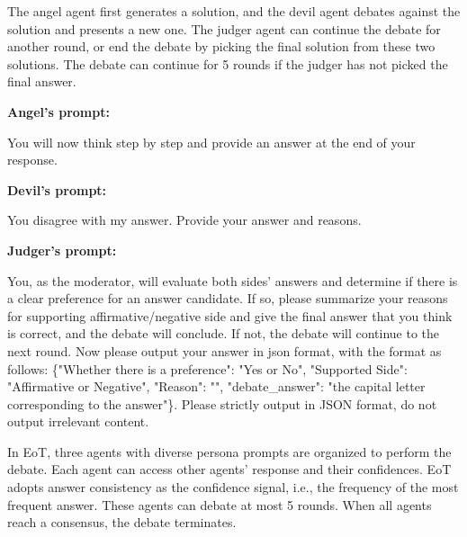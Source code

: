  The angel agent first generates a solution, and the devil agent debates against the solution and presents a new one. The judger agent can continue the debate for another round, or end the debate by picking the final solution from these two solutions. The debate can continue for 5 rounds if the judger has not picked the final answer.

\begin{tcolorbox}[colback=gray!10!white, colframe=black!70!white, breakable]
\textbf{Angel's prompt:}

You will now think step by step and provide an answer at the end of your response.

\textbf{Devil's prompt:}

You disagree with my answer. Provide your answer and reasons.

\textbf{Judger's prompt:}

You, as the moderator, will evaluate both sides' answers and determine if there is a clear preference for an answer candidate. If so, please summarize your reasons for supporting affirmative/negative side and give the final answer that you think is correct, and the debate will conclude. If not, the debate will continue to the next round. Now please output your answer in json format, with the format as follows: \{"Whether there is a preference": "Yes or No", "Supported Side": "Affirmative or Negative", "Reason": "", "debate\_answer": "the capital letter corresponding to the answer"\}. Please strictly output in JSON format, do not output irrelevant content.

\end{tcolorbox}

 In EoT, three agents with diverse persona prompts are organized to perform the debate. Each agent can access other agents' response and their confidences. EoT adopts answer consistency as the confidence signal, i.e., the frequency of the most frequent answer. These agents can debate at most 5 rounds. When all agents reach a consensus, the debate terminates. 

